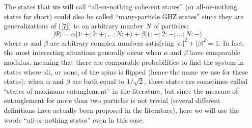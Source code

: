 \documentclass[12pt,onecolumn]{article}%
\begin{document}
\label{complete-ent}

The states that we will call ``all-or-nothing coherent states'' (or
all-or-nothing states for short) could also be called ``many-particle GHZ
states'' since they are generalizations of (\ref{7}) to an arbitrary number
$N$ of particles:%
\begin{equation}
|\Psi\rangle =\alpha|1:+;2:+;\ldots ;N:+\rangle +\beta|1:-;2:-;...;N:-\rangle  \label{20}%
\end{equation}
where $\alpha$ and $\beta$ are arbitrary complex numbers satisfying $\left|
\alpha\right|  ^{2}+\left|  \beta\right|  ^{2}=1$. In fact, the most
interesting situations generally occur when $\alpha$ and $\beta$ have
comparable modulus, meaning that there are comparable probabilities to find
the system in states where all, or none, of the spins is flipped (hence the
name we use for these states); when $\alpha$ and $\beta$ are both equal to
$1/\sqrt{2}$, these states are sometimes called ``states of maximum
entanglement'' in the literature, but since the measure of entanglement for
more than two particles is not trivial (several different definitions have
actually been proposed in the literature), here we will use the words
``all-or-nothing states'' even in this case.
\end{document}
